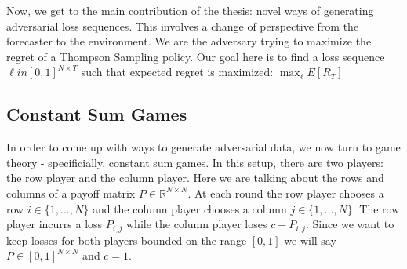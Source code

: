 \documentclass[10pt,a4paper]{article} %
\begin{document}
	Now, we get to the main contribution of the thesis: novel ways of generating adversarial loss sequences.  This involves a change of perspective from the forecaster to the environment.  We are the adversary trying to maximize the regret of a Thompson Sampling policy.  Our goal here is to find a loss sequence $\ell in \left[ 0, 1 \right] ^{N \times T}$ such that expected regret is maximized:  $\max_\ell E[R_T]$
	
	\subsection{Constant Sum Games}
	
	In order to come up with ways to generate adversarial data, we now turn to game theory - specificially, constant sum games.  In this setup, there are two players: the row player and the column player.  Here we are talking about the rows and columns of a payoff matrix $P \in \mathds{R}^{N \times N}$.  At each round the row player chooses a row $i \in \{1, ..., N\}$ and the column player chooses a column $j \in \{1, ..., N\}$.  The row player incurrs a loss $P_{i, j}$ while the column player loses $c - P_{i, j}$.  Since we want to keep losses for both players bounded on the range $\left[ 0, 1 \right] $ we will say $P \in \left[ 0, 1 \right] ^{N \times N}$ and $c = 1$.
		
\end{document}
